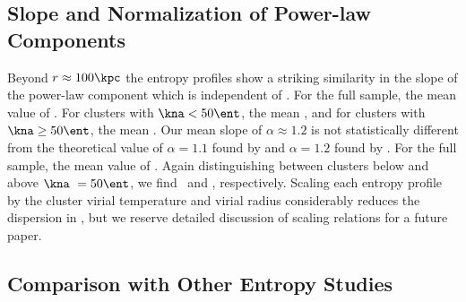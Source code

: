 \documentclass{emulateapj}
\begin{document}
\subsection{Slope and Normalization of Power-law Components}
\label{sec:slopes}

Beyond $r \approx 100 \kpc$ the entropy profiles show a striking
similarity in the slope of the power-law component which is
independent of \kna. For the full sample, the mean value of \alphafs.
For clusters with $\kna < 50 \ent$, the mean \alphaga, and for
clusters with $\kna \geq 50 \ent$, the mean \alphagb. Our mean slope
of $\alpha \approx 1.2$ is not statistically different from the
theoretical value of $\alpha = 1.1$ found by \citet{tozzi01} and
$\alpha = 1.2$ found by \citet{vkb05}. For the full sample, the mean
value of \khunfs. Again distinguishing between clusters below and
above $\kna\ = 50 \ent$, we find \khunga\ and \khungb,
respectively. Scaling each entropy profile by the cluster virial
temperature and virial radius considerably reduces the dispersion in
\khun, but we reserve detailed discussion of scaling relations for a
future paper.

\subsection{Comparison with Other Entropy Studies}
\label{sec:comp}
\end{document}
